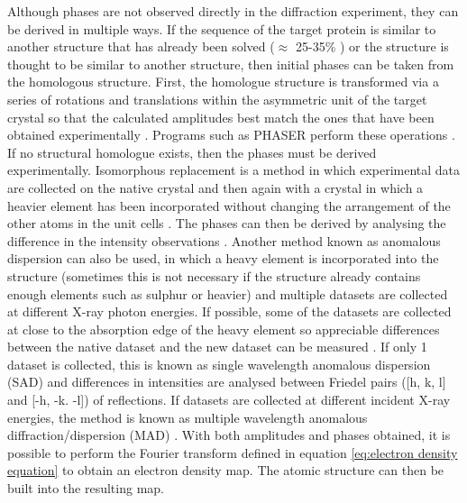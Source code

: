         Although phases are not observed directly in the diffraction experiment, they can be derived in multiple ways.
        If the sequence of the target protein is similar to another structure that has already been solved ($\approx$ 25-35\% \cite{taylor2010,abergel2013molecular}) or the structure is thought to be similar to another structure, then initial phases can be taken from the homologous structure.
        First, the homologue structure is transformed via a series of rotations and translations within the asymmetric unit of the target crystal so that the calculated amplitudes best match the ones that have been obtained experimentally \cite{mccoy2007solving}.
        Programs such as PHASER perform these operations \cite{mccoy2007phaser}.
        \newline
        If no structural homologue exists, then the phases must be derived experimentally.
        Isomorphous replacement is a method in which experimental data are collected on the native crystal and then again with a crystal in which a heavier element has been incorporated without changing the arrangement of the other atoms in the unit cells \cite{perutz1956isomorphous}.
        The phases can then be derived by analysing the difference in the intensity observations \cite{taylor2010}.
        \newline
        Another method known as anomalous dispersion can also be used, in which a heavy element is incorporated into the structure (sometimes this is not necessary if the structure already contains enough elements such as sulphur or heavier) and multiple datasets are collected at different X-ray photon energies.
        If possible, some of the datasets are collected at close to the absorption edge of the heavy element so appreciable differences between the native dataset and the new dataset can be measured \cite{bijvoet1954structure}.
        If only 1 dataset is collected, this is known as single wavelength anomalous dispersion (SAD) and differences in intensities are analysed between Friedel pairs ([h, k, l] and [-h, -k. -l]) of reflections.
        If datasets are collected at different incident X-ray energies, the method is known as multiple wavelength anomalous diffraction/dispersion (MAD) \cite{hendrickson1991determination,taylor2010}.
        \newline
        With both amplitudes and phases obtained, it is possible to perform the Fourier transform defined in equation \ref{eq:electron density equation} to obtain an electron density map.
        The atomic structure can then be built into the resulting map.
